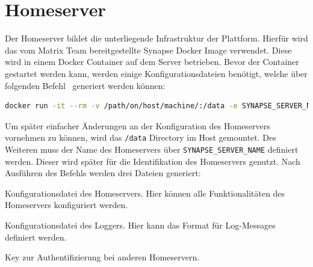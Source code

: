     \section{Homeserver}\label{sec:homeserver}
    Der Homeserver bildet die unterliegende Infrastruktur der Plattform.
    Hierfür wird das vom Matrix Team bereitgestellte Synapse Docker Image verwendet.
    Diese wird in einem Docker Container auf dem Server betrieben.
    Bevor der Container gestartet werden kann, werden einige Konfigurationsdateien benötigt, welche über folgenden Befehl~\cite{synapse} generiert werden können:
    \begin{lstlisting}[language=bash,label={lst:synapse-generate}]
docker run -it --rm -v /path/on/host/machine/:/data -e SYNAPSE_SERVER_NAME=my.matrix.host -e SYNAPSE_REPORT_STATS=yes matrixdotorg/synapse:latest generate
    \end{lstlisting}
    Um später einfacher Änderungen an der Konfiguration des Homeservers vornehmen zu können, wird das \texttt{/data} Directory im Host gemountet.
    Des Weiteren muss der Name des Homeservers über \texttt{SYNAPSE\_SERVER\_NAME} definiert werden.
    Dieser wird später für die Identifikation des Homeservers genutzt.
    Nach Ausführen des Befehls werden drei Dateien generiert:
    \begin{description}[leftmargin=!,labelwidth=4cm]
        \item [homeserver.yaml] Konfigurationsdatei des Homeservers. Hier können alle Funktionalitäten des Homeservers konfiguriert werden.
        \item [my.matrix.host.log.config] Konfigurationsdatei des Loggers. Hier kann das Format für Log-Messages definiert werden.
        \item [my.matrix.host.signing.key] Key zur Authentifizierung bei anderen Homeservern.
    \end{description}

